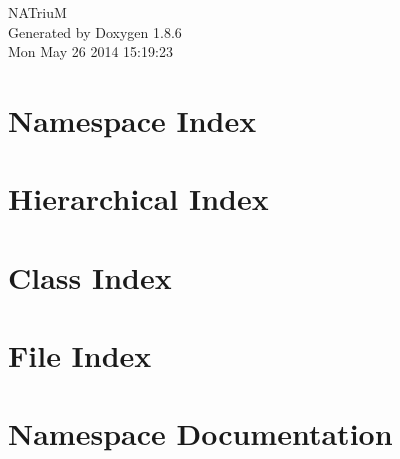 \documentclass[twoside]{book}
\newcommand{\clearemptydoublepage}{%
  \newpage{\pagestyle{empty}\cleardoublepage}%
}
\begin{document}
\hypersetup{pageanchor=false}
\begin{titlepage}
\vspace*{7cm}
\begin{center}%
{\Large N\-A\-Triu\-M }\\
\vspace*{1cm}
{\large Generated by Doxygen 1.8.6}\\
\vspace*{0.5cm}
{\small Mon May 26 2014 15:19:23}\\
\end{center}
\end{titlepage}
\clearemptydoublepage
\tableofcontents
\clearemptydoublepage
{}
\hypersetup{pageanchor=true}

\chapter{Namespace Index}

\chapter{Hierarchical Index}

\chapter{Class Index}

\chapter{File Index}

\chapter{Namespace Documentation}

\end{document}
